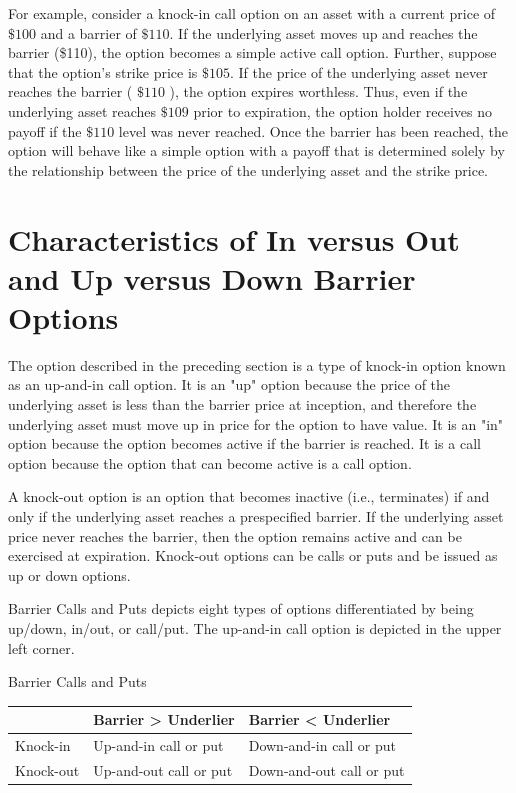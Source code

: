\documentclass[11pt]{article}
\begin{document}
For example, consider a knock-in call option on an asset with a current price of $\$ 100$ and a barrier of $\$ 110$. If the underlying asset moves up and reaches the barrier (\$110), the option becomes a simple active call option. Further, suppose that the option's strike price is $\$ 105$. If the price of the underlying asset never reaches the barrier ( $\$ 110$ ), the option expires worthless. Thus, even if the underlying asset reaches $\$ 109$ prior to expiration, the option holder receives no payoff if the $\$ 110$ level was never reached. Once the barrier has been reached, the option will behave like a simple option with a payoff that is determined solely by the relationship between the price of the underlying asset and the strike price.

\section*{Characteristics of In versus Out and Up versus Down Barrier Options}
The option described in the preceding section is a type of knock-in option known as an up-and-in call option. It is an "up" option because the price of the underlying asset is less than the barrier price at inception, and therefore the underlying asset must move up in price for the option to have value. It is an "in" option because the option becomes active if the barrier is reached. It is a call option because the option that can become active is a call option.

A knock-out option is an option that becomes inactive (i.e., terminates) if and only if the underlying asset reaches a prespecified barrier. If the underlying asset price never reaches the barrier, then the option remains active and can be exercised at expiration. Knock-out options can be calls or puts and be issued as up or down options.

Barrier Calls and Puts depicts eight types of options differentiated by being up/down, in/out, or call/put. The up-and-in call option is depicted in the upper left corner.

Barrier Calls and Puts

\begin{center}
\begin{tabular}{lll}
 & Barrier > Underlier & Barrier < Underlier \\
\hline
Knock-in & Up-and-in call or put & Down-and-in call or put \\
Knock-out & Up-and-out call or put & Down-and-out call or put \\
\hline
\end{tabular}
\end{center}
\end{document}
